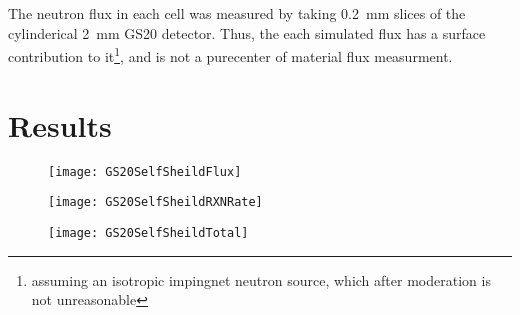 \documentclass[draftcls,onecolumn]{IEEEtran}
\begin{document}
The neutron flux in each cell was measured by taking \SI{0.2}{\mm} slices of the cylinderical \SI{2}{\mm} GS20 detector.
Thus, the each simulated flux has a surface contribution to it\footnote{assuming an isotropic impingnet neutron source, which after moderation is not unreasonable}, and is not a purecenter of material flux measurment.

\section{Results}
\begin{figure}
	\texttt{[image: GS20SelfSheildFlux]}
	\caption[Flux Profile through GS20]{}
	\label{fig:Flux}
\end{figure}
\begin{figure}
	\texttt{[image: GS20SelfSheildRXNRate]}
	\caption[Reaction Rate through GS20]{}
	\label{fig:RxnRate}
\end{figure}
\begin{figure}
	\texttt{[image: GS20SelfSheildTotal]}
	\caption[Total Reaction Rate]{}
	\label{fig:TotalRxn}
\end{figure}
\end{document}
